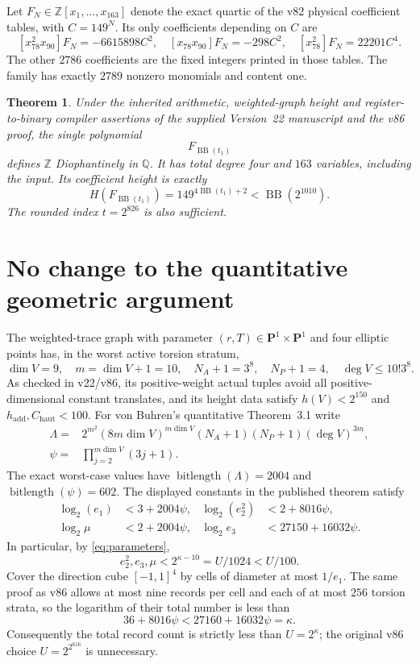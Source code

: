 \documentclass[11pt]{article}
\newtheorem{theorem}{Theorem}
\newcommand{\Q}{\mathbb Q}
\newcommand{\Z}{\mathbb Z}
\newcommand{\BB}{\operatorname{BB}}
\begin{document}
Let $F_N\in\Z[x_1,\ldots,x_{163}]$ denote the exact
quartic of the v82 physical coefficient tables, with
$C=149^N$. Its only coefficients depending on $C$ are
\[
 [x_{78}^2x_{90}]F_N=-6615898C^2,\quad
 [x_{78}x_{90}]F_N=-298C^2,\quad
 [x_{78}^2]F_N=22201C^4.
\]
The other $2786$ coefficients are the fixed integers printed in those
tables. The family has exactly $2789$ nonzero monomials and content one.

\begin{theorem}\label{thm:main}
Under the inherited arithmetic, weighted-graph height and
register-to-binary compiler assertions of the supplied Version~22
manuscript and the v86 proof, the single polynomial
\[
 \boxed{F_{\BB(t_1)}}
\]
defines $\Z$ Diophantinely in $\Q$. It has total degree four and
$163$ variables, including the input. Its coefficient height is
exactly
\[
 H(F_{\BB(t_1)})=149^{4\BB(t_1)+2}
                 <\BB(2^{1010}).
\]
The rounded index $t=2^{826}$ is also sufficient.
\end{theorem}

\section{No change to the quantitative geometric argument}
The weighted-trace graph with parameter
$(r,T)\in\mathbf P^1\times\mathbf P^1$ and four elliptic points has,
in the worst active torsion stratum,
\[
 \dim V=9,\quad m=\dim V+1=10,\quad
 N_A+1=3^8,\quad N_P+1=4,\quad
 \deg V\le10!3^8.
\]
As checked in v22/v86, its positive-weight actual tuples avoid
all positive-dimensional constant translates, and its height data
satisfy $h(V)<2^{150}$ and
$h_{\mathrm{add}},C_{\mathrm{haut}}<100$.
For von Buhren's quantitative Theorem~3.1 write
\[
\begin{aligned}
\Lambda={}&2^{m^2}(8m\dim V)^{m\dim V}
       (N_A+1)(N_P+1)(\deg V)^{3m},\\
\psi={}&\prod_{j=2}^{m\dim V}(3j+1).
\end{aligned}
\]
The exact worst-case values have
$\operatorname{bitlength}(\Lambda)=2004$ and
$\operatorname{bitlength}(\psi)=602$.
The displayed constants in the published theorem satisfy
\[
\begin{aligned}
\log_2(e_1)&<3+2004\psi,&
\log_2(e_2^2)&<2+8016\psi,\\
\log_2\mu&<2+2004\psi,&
\log_2e_3&<27150+16032\psi.
\end{aligned}
\]
In particular, by \eqref{eq:parameters},
\begin{equation}\label{eq:margin}
 e_2^2,e_3,\mu < 2^{\kappa-10}=U/1024<U/100.
\end{equation}
Cover the direction cube $[-1,1]^4$ by cells of diameter at most
$1/e_1$. The same proof as v86 allows at most nine records per cell
and each of at most $256$ torsion strata, so the logarithm of their
total number is less than
\[
 36+8016\psi<27160+16032\psi=\kappa.
\]
Consequently the total record count is strictly less than
$U=2^\kappa$; the original v86 choice $U=2^{2^{616}}$ is unnecessary.
\end{document}
